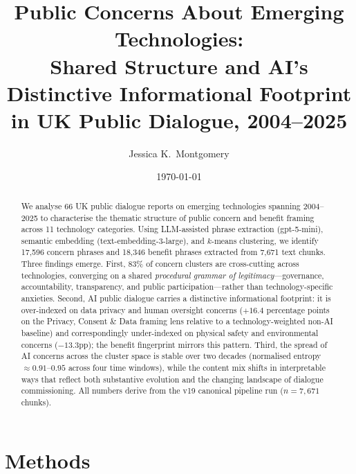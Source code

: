\documentclass[11pt, a4paper]{article}
\title{Public Concerns About Emerging Technologies:\\
Shared Structure and AI's Distinctive Informational Footprint\\
in UK Public Dialogue, 2004--2025}
\author{Jessica K.\ Montgomery}
\date{\today}
\begin{document}
\maketitle

\begin{abstract}
We analyse 66 UK public dialogue reports on emerging technologies spanning
2004--2025 to characterise the thematic structure of public concern and
benefit framing across 11 technology categories.  Using LLM-assisted phrase
extraction (gpt-5-mini), semantic embedding (text-embedding-3-large), and
$k$-means clustering, we identify 17,596 concern phrases and 18,346 benefit
phrases extracted from 7,671 text chunks.  Three findings emerge.  First,
83\% of concern clusters are cross-cutting across technologies, converging
on a shared \emph{procedural grammar of legitimacy}---governance,
accountability, transparency, and public participation---rather than
technology-specific anxieties.  Second, AI public dialogue carries a
distinctive informational footprint: it is over-indexed on data privacy and
human oversight concerns ($+16.4$ percentage points on the Privacy, Consent
\& Data framing lens relative to a technology-weighted non-AI baseline) and
correspondingly under-indexed on physical safety and environmental concerns
($-13.3$pp); the benefit fingerprint mirrors this pattern.  Third, the
spread of AI concerns across the cluster space is stable over two decades
(normalised entropy $\approx 0.91$--$0.95$ across four time windows), while
the content mix shifts in interpretable ways that reflect both substantive
evolution and the changing landscape of dialogue commissioning.  All numbers
derive from the v19 canonical pipeline run ($n = 7{,}671$ chunks).
\end{abstract}

\tableofcontents
\newpage

\section{Methods}

\end{document}
